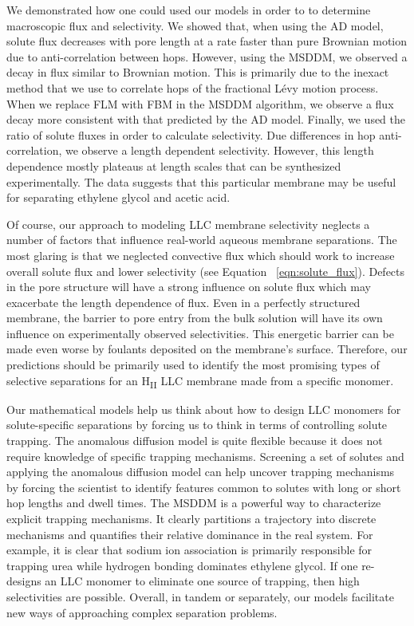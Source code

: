 \documentclass{article}
\begin{document}
  We demonstrated how one could used our models in order to to determine
  macroscopic flux and selectivity. We showed that, when using the AD model, 
  solute flux decreases with pore length at a rate faster than pure 
  Brownian motion due to anti-correlation between hops. However, using the
  MSDDM, we observed a decay in flux similar to Brownian motion. This is
  primarily due to the inexact method that we use to correlate hops of the 
  fractional L\'evy motion process. When we replace FLM with FBM in the 
  MSDDM algorithm, we observe a flux decay more consistent with that predicted
  by the AD model. Finally, we used the ratio of solute fluxes in order to
  calculate selectivity. Due differences in hop anti-correlation, we observe
  a length dependent selectivity. However, this length dependence mostly
  plateaus at length scales that can be synthesized experimentally. The data
  suggests that this particular membrane may be useful for separating
  ethylene glycol and acetic acid.

  Of course, our approach to modeling LLC membrane selectivity neglects a number
  of factors that influence real-world aqueous membrane separations. The most 
  glaring is that we neglected convective flux which should work to increase 
  overall solute flux and lower selectivity (see Equation ~\ref{eqn:solute_flux}).
  Defects in the pore structure will have a strong influence on solute flux which
  may exacerbate the length dependence of flux. Even in a perfectly structured 
  membrane, the barrier to pore entry from the bulk solution will have its own 
  influence on experimentally observed selectivities. This energetic barrier can 
  be made even worse by foulants deposited on the membrane's surface. Therefore,
  our predictions should be primarily used to identify the most promising types
  of selective separations for an H\textsubscript{II} LLC membrane made from a 
  specific monomer.

  Our mathematical models help us think about how to design LLC monomers for 
  solute-specific separations by forcing us to think in terms of controlling 
  solute trapping. The anomalous diffusion model is quite flexible because it
  does not require knowledge of specific trapping mechanisms. Screening a set
  of solutes and applying the anomalous diffusion model can help uncover
  trapping mechanisms by forcing the scientist to identify features common 
  to solutes with long or short hop lengths and dwell times. The MSDDM is a 
  powerful way to characterize explicit trapping mechanisms. It clearly
  partitions a trajectory into discrete mechanisms and quantifies their
  relative dominance in the real system. For example, it is clear that 
  sodium ion association is primarily responsible for trapping urea while 
  hydrogen bonding dominates ethylene glycol. If one re-designs an LLC monomer
  to eliminate one source of trapping, then high selectivities are possible.
  Overall, in tandem or separately, our models facilitate new ways of approaching
  complex separation problems.
  
\end{document}
